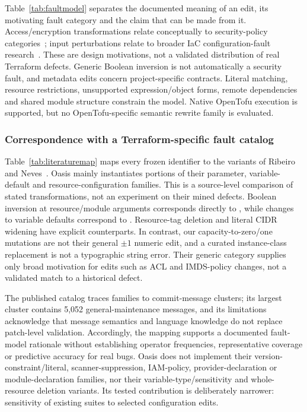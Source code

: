 Table~\ref{tab:faultmodel} separates the documented meaning of an edit, its motivating fault category and the claim that can be made from it. Access/encryption transformations relate conceptually to security-policy categories~\cite{verdet}; input perturbations relate to broader IaC configuration-fault research~\cite{drosos}. These are design motivations, not a validated distribution of real Terraform defects. Generic Boolean inversion is not automatically a security fault, and metadata edits concern project-specific contracts. Literal matching, resource restrictions, unsupported expression/object forms, remote dependencies and shared module structure constrain the model. Native OpenTofu execution is supported, but no OpenTofu-specific semantic rewrite family is evaluated.


\subsubsection{Correspondence with a Terraform-specific fault catalog}\label{sec:literaturemapping}
Table~\ref{tab:literaturemap} maps every frozen identifier to the variants of Ribeiro and Neves~\cite{ribeiro}. Oasis mainly instantiates portions of their parameter, variable-default and resource-configuration families. This is a source-level comparison of stated transformations, not an experiment on their mined defects. Boolean inversion at resource/module arguments corresponds directly to , while changes to variable defaults correspond to . Resource-tag deletion and literal CIDR widening have explicit counterparts. In contrast, our capacity-to-zero/one mutations are not their general $\pm1$ numeric edit, and a curated instance-class replacement is not a typographic string error. Their generic  category supplies only broad motivation for edits such as ACL and IMDS-policy changes, not a validated match to a historical defect.

The published catalog traces families to commit-message clusters; its largest cluster contains 5,052 general-maintenance messages, and its limitations acknowledge that message semantics and language knowledge do not replace patch-level validation. Accordingly, the mapping supports a documented fault-model rationale without establishing operator frequencies, representative coverage or predictive accuracy for real bugs. Oasis does not implement their version-constraint/literal, scanner-suppression, IAM-policy, provider-declaration or module-declaration families, nor their variable-type/sensitivity and whole-resource deletion variants. Its tested contribution is deliberately narrower: sensitivity of existing suites to selected configuration edits.

\FloatBarrier

